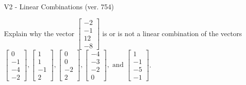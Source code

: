 \begin{exercise}
  \begin{exerciseTitle}V2 - Linear Combinations (ver. 754)\end{exerciseTitle}
  \begin{exerciseStatement}
    Explain why the vector \(\left[\begin{array}{c}
-2 \\
-1 \\
12 \\
-8
\end{array}\right]\)  is or is not a linear 
	combination of the vectors \(\left[\begin{array}{c}
0 \\
-1 \\
-4 \\
-2
\end{array}\right] , \left[\begin{array}{c}
1 \\
1 \\
-1 \\
2
\end{array}\right] , \left[\begin{array}{c}
0 \\
0 \\
-2 \\
2
\end{array}\right] , \left[\begin{array}{c}
-4 \\
-3 \\
-2 \\
0
\end{array}\right] , \text{ and } \left[\begin{array}{c}
1 \\
-1 \\
-5 \\
-1
\end{array}\right]\).
	



\end{exerciseStatement}
\end{exercise}
